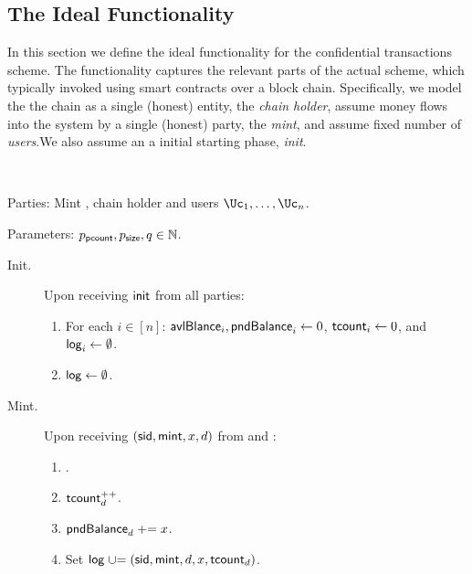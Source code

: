 \subsection{The Ideal Functionality}\label{sec:MainProtocol:Ideal}
In this section we define the ideal functionality for the confidential transactions scheme. The functionality  captures the relevant parts of the actual scheme, which typically invoked using smart contracts over a block chain. Specifically, we model the  the chain as a single (honest) entity, the \textit{chain holder}, assume money flows into the system by a single (honest) party, the \textit{mint}, and assume fixed number of \textit{users}.We also assume an a initial starting phase,  \textit{init}.

\begin{functionality}\label{func:ConfidentialTransactions}~
	
	
	
	\item[Parties:]	Mint \Mc, chain holder  \Cc and users  $\Uc_1, 
	\ldots,\Uc_n$.
	
	
	\item[Parameters:] $p_{\mathsf{pcount}},p_{\mathsf{size}},q \in {\mathbb{N}}$.
	
	
	\begin{description}
		\item[Init.] Upon receiving $\mathsf{init}$ from  all parties: 
		\begin{enumerate}
			\item  For each $i\in [n]$:  $\mathsf{avlBlance}_i,\mathsf{pndBalance}_i \leftarrow 0$, $\mathsf{tcount}_i \leftarrow 0$, and  $\mathsf{log}_i \leftarrow \emptyset$.
			
			\item  $\mathsf{log} \leftarrow \emptyset$.
		\end{enumerate}
		
			\item[Mint.]   Upon receiving $(\mathsf{sid},\mathsf{mint},x,d)$ from  \Cc and \Mc:
		\begin{enumerate}
			
			
			\item {}.
			
			\item $\mathsf{tcount}_d^{++}$.
			
			\item $\mathsf{pndBalance}_d \mathrel{+}= x$.
			
			\item Set $\mathsf{log} \mathrel{\cup}= {(\mathsf{sid},\mathsf{mint},d,x,\mathsf{tcount}_d)}$.
		\end{enumerate}
		

\end{description}
\end{functionality}
